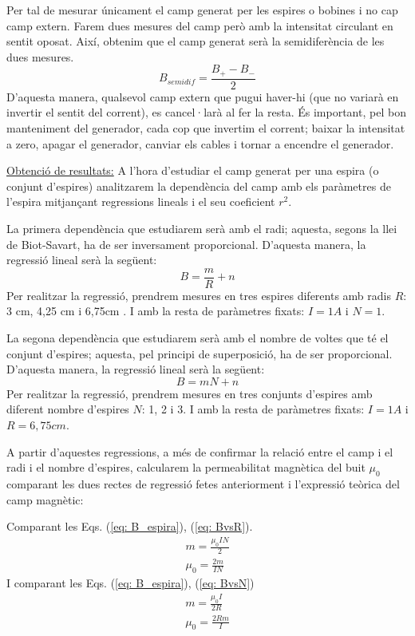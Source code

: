 \documentclass[11pt]{article}
\numberwithin{equation}{section}
\numberwithin{figure}{section}
\numberwithin{table}{section}
\begin{document}
Per tal de mesurar únicament el camp generat per les espires o bobines i no cap camp extern. Farem dues mesures del camp però amb la intensitat circulant en sentit oposat. Així, obtenim que el camp generat serà la semidiferència de les dues mesures.
\begin{equation} \label{eq: B_semidif}
    B_{semidif} = \frac{B_+ - B_-}{2}
\end{equation}
D'aquesta manera, qualsevol camp extern que pugui haver-hi (que no variarà en invertir el sentit del corrent), es cancel·larà al fer la resta. És important, pel bon manteniment del generador, cada cop que invertim el corrent; baixar la intensitat a zero,  apagar el generador, canviar els cables i tornar a encendre el generador.

\underline{Obtenció de resultats:} A l'hora d'estudiar el camp generat per una espira (o conjunt d'espires) analitzarem la dependència del camp amb els paràmetres de l'espira mitjançant regressions lineals i el seu coeficient $r^2$. 

La primera dependència que estudiarem serà amb el radi; aquesta, segons la llei de Biot-Savart, ha de ser inversament proporcional. D'aquesta manera, la regressió lineal serà la següent:
\begin{equation}\label{eq: BvsR}
    B=\frac{m}{R} + n
\end{equation}
Per realitzar la regressió, prendrem mesures en tres espires diferents amb radis $R$: 3 cm, 4,25 cm i 6,75cm . I amb la resta de paràmetres fixats: $I=1A$ i $N=1$. 

La segona dependència que estudiarem serà amb el nombre de voltes que té el conjunt d'espires; aquesta, pel principi de superposició, ha de ser proporcional. D'aquesta manera, la regressió lineal serà la següent:
\begin{equation}\label{eq: BvsN}
    B=mN + n
\end{equation}
Per realitzar la regressió, prendrem mesures en tres conjunts d'espires amb diferent nombre d'espires $N$: 1, 2 i 3. I amb la resta de paràmetres fixats: $I=1A$ i $R = 6,75 cm$. 

A partir d'aquestes regressions, a més de confirmar la relació entre el camp i el radi i el nombre d'espires, calcularem la permeabilitat magnètica del buit $\mu_0$ comparant les dues rectes de regressió fetes anteriorment i l'expressió teòrica del camp magnètic:

Comparant les Eqs. (\ref{eq: B_espira}), (\ref{eq: BvsR}).
\begin{align} \label{eq: mu1}
    m = \frac{\mu_0IN}{2}      \nonumber \\
    \mu_0=\frac{2m}{IN}
\end{align}
I comparant les Eqs. (\ref{eq: B_espira}), (\ref{eq: BvsN})
\begin{align} \label{eq: mu2}
    m = \frac{\mu_0I}{2R}        \nonumber \\
    \mu_0=\frac{2Rm}{I}
\end{align}
\end{document}
